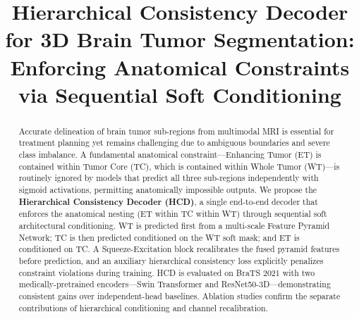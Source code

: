 \documentclass[conference]{IEEEtran}
\begin{document}
\title{Hierarchical Consistency Decoder for 3D Brain Tumor Segmentation:
Enforcing Anatomical Constraints via Sequential Soft Conditioning}

\author{
\and
{}
\and
{}
}

\maketitle

\begin{abstract}
Accurate delineation of brain tumor sub-regions from multimodal MRI
is essential for treatment planning yet remains challenging due to
ambiguous boundaries and severe class imbalance. A fundamental
anatomical constraint---Enhancing Tumor (ET) is contained within
Tumor Core (TC), which is contained within Whole Tumor
(WT)---is routinely ignored by models that predict all three
sub-regions independently with sigmoid activations, permitting
anatomically impossible outputs. We propose the \textbf{Hierarchical
Consistency Decoder (HCD)}, a single end-to-end decoder that enforces
the anatomical nesting (ET within TC within WT) through sequential soft
architectural conditioning. WT is predicted first from a multi-scale
Feature Pyramid Network; TC is then predicted conditioned on the WT
soft mask; and ET is conditioned on TC. A Squeeze-Excitation block
recalibrates the fused pyramid features before prediction, and an
auxiliary hierarchical consistency loss explicitly penalizes constraint
violations during training. HCD is evaluated on BraTS 2021 with two
medically-pretrained encoders---Swin Transformer and
ResNet50-3D---demonstrating consistent gains over independent-head
baselines. Ablation studies confirm the separate contributions of
hierarchical conditioning and channel recalibration.
\end{abstract}
\end{document}
